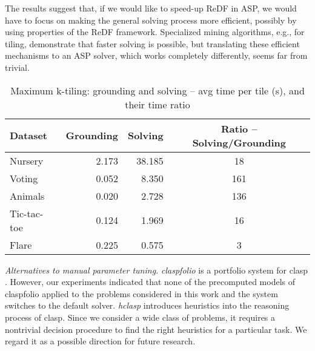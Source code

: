 The results suggest that, if we would like to speed-up ReDF in ASP, we would have to focus on making the general solving process more efficient, possibly by using properties of the ReDF framework. Specialized mining algorithms, e.g., for tiling, demonstrate that faster solving is possible, but translating these efficient mechanisms to an ASP solver, which works completely differently, seems far from trivial.

\begin{table}\footnotesize
  \caption{Maximum k-tiling: grounding and solving -- avg time per tile (s), and their time ratio}
  \label{table:steps-time}
\vspace{-10pt}
\begin{center}
\begin{tabular}{lrrc}
  Dataset & Grounding & \phantom{text} Solving & \phantom{aaa} Ratio -- Solving/Grounding \\ \hline
Nursery     &2.173&38.185 & 18 \\
Voting      &0.052&8.350 & 161  \\
Animals     &0.020&2.728 & 136 \\
Tic-tac-toe &0.124&1.969 & 16  \\
Flare       &0.225&0.575 & 3
\end{tabular}
\end{center}
\end{table}

\textit{Alternatives to manual parameter tuning.} \textit{claspfolio} is a portfolio system for clasp \parencite{gekakascsczi11a}. However, our experiments indicated that none of the precomputed models of claspfolio applied to the problems considered in this work and the system switches to the default solver. \textit{hclasp} \parencite{conf/aaai/GebserKROSW13} introduces heuristics into the reasoning process of clasp. Since we consider a wide class of problems, it requires a nontrivial decision procedure to find the right heuristics for a particular task. We regard it as a possible direction for future research.

